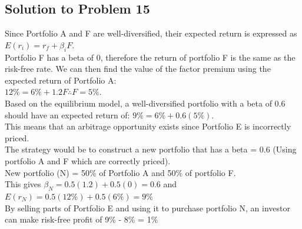 \documentclass[12]{article}
\begin{document}
\subsection*{Solution to Problem 15}
Since Portfolio A and F are well-diversified, their expected return is expressed as 
$E(r_i) = r_f + \beta_{i}F$.\\
Portfolio F has a beta of 0, therefore the return of portfolio F is the same as the risk-free rate.
We can then find the value of the factor premium using the expected return of Portfolio A:\\
$12\% = 6\% + 1.2F \therefore F = 5\%$.\\
Based on the equilibrium model, a well-diversified portfolio with a beta of 0.6 should have an expected return of: $9\% = 6\% + 0.6(5\%)$.\\
This means that an arbitrage opportunity exists since Portfolio E is incorrectly priced.\\
The strategy would be to construct a new portfolio that has a beta = 0.6 ({Using portfolio A and  F which are correctly priced}).\\
New portfolio (N) =  50\% of Portfolio A and 50\% of portfolio F.\\
This gives $\beta_N = 0.5(1.2) + 0.5(0) = 0.6$ and\\
$E(r_N) = 0.5(12\%) + 0.5(6\%) = 9\%$\\
By selling parts of Portfolio E and using it to purchase portfolio N, an investor can make risk-free profit of 9\% - 8\% = 1\%
\end{document}
